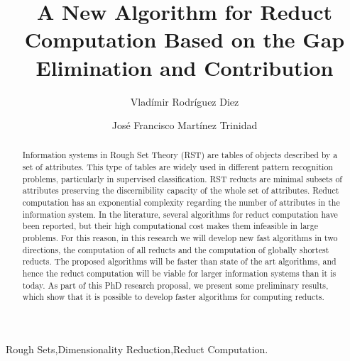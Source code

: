 \documentclass[authoryear,11pt]{elsarticle}
\begin{document}
	
	\title{A New Algorithm for Reduct Computation Based on the Gap Elimination and Contribution}
	
	\author{Vlad\'imir Rodr\'iguez Diez}
	\author{Jos\'e Francisco Mart\'inez Trinidad}
	
	\address{Computer Science Department\\National Institute of
	Astrophysics, Optics and Electronics\\
	Luis Enrique Erro \# 1, Santa Mar\'{\i}a Tonantzintla, Puebla,
	72840, M\'{e}xico} 
	
	
	
	\begin{abstract}
		Information systems in Rough Set Theory (RST) are tables of objects described by a set of attributes. 
		This type of tables are widely used in different pattern recognition problems, particularly in 
		supervised classification. RST reducts are minimal subsets of attributes preserving 
		the discernibility capacity of the whole set of attributes. Reduct computation has an exponential
		complexity regarding the number of attributes in the information system. In the literature, several
		algorithms for reduct computation have been reported, but their high computational cost makes 
		them infeasible in large problems. For this reason, in this research we will develop new fast
		algorithms in two directions, the computation of all reducts and the computation of globally 
		shortest reducts. The proposed algorithms will be faster than state of the art algorithms, and hence 
		the reduct computation will be viable for larger information systems than it is today. As part of this 
		PhD research proposal, we present some preliminary results, which show that it is possible to develop
		faster algorithms for computing reducts.
	\end{abstract}
	
	\begin{keyword}
		Rough Sets\sep Dimensionality Reduction\sep Reduct Computation.
	\end{keyword}

	\maketitle

\end{document}
